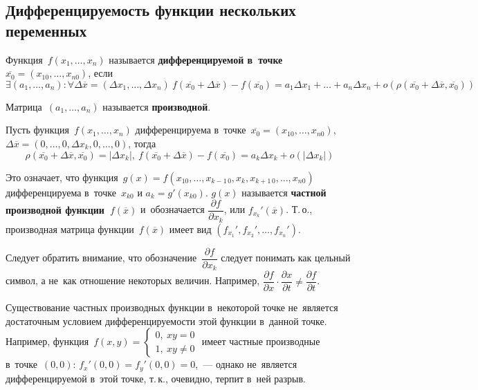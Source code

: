 \subsection{Дифференцируемость функции нескольких переменных}
Функция~$f(x_1, \ldots, x_n)$ называется \textbf{дифференцируемой в~точке~$\overline{x_0} = (x_{10}, \ldots, x_{n0})$}, если
\begin{equation*}
\exists (a_1, \ldots, a_n) \colon \forall \Delta \overline x = (\Delta x_1, \ldots, \Delta x_n) \
f(\overline{x_0} + \Delta \overline x) - f(\overline{x_0}) =
a_1 \Delta x_1 + \ldots + a_n \Delta x_n + o(\rho(\overline{x_0} + \Delta \overline x, \overline{x_0}))
\end{equation*}

Матрица~$(a_1, \ldots, a_n)$ называется \textbf{производной}.

Пусть функция~$f(x_1, \ldots, x_n)$ дифференцируема в~точке~$\overline{x_0} = (x_{10}, \ldots, \allowbreak x_{n0})$, $\Delta \overline x = (0, \ldots, \allowbreak 0, \Delta x_k, \allowbreak 0, \ldots, \allowbreak 0)$, тогда
\begin{equation*}
\rho(\overline{x_0} + \Delta \overline x, \overline{x_0}) = |\Delta x_k|, \
f(\overline{x_0} + \Delta \overline x) - f(\overline{x_0}) =
a_k \Delta x_k + o(|\Delta x_k|)
\end{equation*}

Это означает, что функция~$g(x) = f(x_{10}, \ldots, x_{k-1\, 0}, x_k, x_{k+1\, 0}, \ldots, x_{n0})$ дифференцируема в~точке~$x_{k0}$ и $a_k = g'(x_{k0})$.
 $g(x)$ называется \textbf{частной производной функции~$f(\overline x)$} и~обозначается $\dfrac{\partial f}{\partial x_k}$, или $f_{x_k}'(\overline x)$.
Т.\,о., производная матрица функции~$f(\overline x)$ имеет вид $(f_{x_1}', f_{x_2}', \ldots, f_{x_n}')$.

Следует обратить внимание, что обозначение~$\dfrac{\partial f}{\partial x_k}$ следует понимать как цельный символ, а не~как отношение некоторых величин.
Например, $\dfrac{\partial f}{\partial x} \cdot \dfrac{\partial x}{\partial t} \neq \dfrac{\partial f}{\partial t}$.

Существование частных производных функции в~некоторой точке не~является достаточным условием дифференцируемости этой функции в~данной точке.
Например, функция~$f(x, y) =
\begin{cases}
0, \ xy = 0 \\
1, \ xy \neq 0
\end{cases}$
имеет частные производные в~точке~$(0, 0)$: $f_x'(0, 0) = f_y'(0, 0) = 0$,~--- однако не~является дифференцируемой в~этой точке, т.\,к., очевидно, терпит в~ней разрыв.

